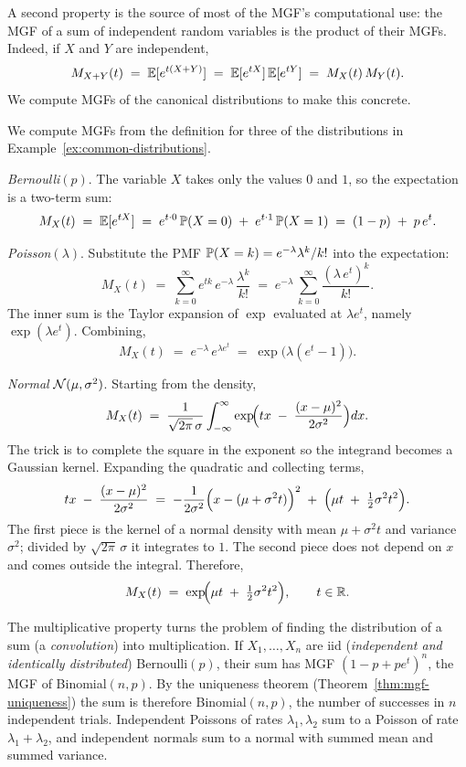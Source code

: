 A second property is the source of most of the MGF's computational use: the MGF of a sum of independent random variables is the product of their MGFs. Indeed, if \(X\) and \(Y\) are independent,
\[
  M_{X+Y}(t) \;=\; \mathbb{E}[e^{t(X+Y)}] \;=\; \mathbb{E}[e^{tX}]\, \mathbb{E}[e^{tY}] \;=\; M_X(t)\, M_Y(t).
\]
We compute MGFs of the canonical distributions to make this concrete.

\begin{example}\label{ex:mgfs}
We compute MGFs from the definition for three of the distributions in Example~\ref{ex:common-distributions}.

\smallskip
\noindent\emph{Bernoulli}\((p)\). The variable \(X\) takes only the values \(0\) and \(1\), so the expectation is a two-term sum:
\[
  M_X(t) \;=\; \mathbb{E}[e^{tX}]
  \;=\; e^{t \cdot 0}\, \mathbb{P}(X = 0) \;+\; e^{t \cdot 1}\, \mathbb{P}(X = 1)
  \;=\; (1 - p) \;+\; p\, e^t.
\]

\smallskip
\noindent\emph{Poisson}\((\lambda)\). Substitute the PMF \(\mathbb{P}(X = k) = e^{-\lambda} \lambda^k / k!\) into the expectation:
\[
  M_X(t) \;=\; \sum_{k = 0}^\infty e^{tk}\, e^{-\lambda}\, \frac{\lambda^k}{k!}
  \;=\; e^{-\lambda}\, \sum_{k = 0}^\infty \frac{(\lambda\, e^{t})^k}{k!}.
\]
The inner sum is the Taylor expansion of \(\exp\) evaluated at \(\lambda e^t\), namely \(\exp(\lambda e^t)\). Combining,
\[
  M_X(t) \;=\; e^{-\lambda}\, e^{\lambda e^t}
  \;=\; \exp\!\bigl(\lambda (e^t - 1)\bigr).
\]

\smallskip
\noindent\emph{Normal} \(\mathcal{N}(\mu, \sigma^2)\). Starting from the density,
\[
  M_X(t) \;=\; \frac{1}{\sqrt{2 \pi}\, \sigma} \int_{-\infty}^\infty \exp\!\Bigl(t x \;-\; \frac{(x - \mu)^2}{2 \sigma^2}\Bigr) dx.
\]
The trick is to complete the square in the exponent so the integrand becomes a Gaussian kernel. Expanding the quadratic and collecting terms,
\[
  t x \;-\; \frac{(x - \mu)^2}{2 \sigma^2}
  \;=\; -\frac{1}{2 \sigma^2}\Bigl(x - (\mu + \sigma^2 t)\Bigr)^2 \;+\; \Bigl(\mu t \;+\; \tfrac{1}{2}\sigma^2 t^2\Bigr).
\]
The first piece is the kernel of a normal density with mean \(\mu + \sigma^2 t\) and variance \(\sigma^2\); divided by \(\sqrt{2 \pi}\, \sigma\) it integrates to \(1\). The second piece does not depend on \(x\) and comes outside the integral. Therefore,
\[
  M_X(t) \;=\; \exp\!\Bigl(\mu t \;+\; \tfrac{1}{2} \sigma^2 t^2\Bigr), \qquad t \in \mathbb{R}.
\]
\end{example}

The multiplicative property turns the problem of finding the distribution of a sum (a \emph{convolution}) into multiplication. If \(X_1, \ldots, X_n\) are iid (\emph{independent and identically distributed}) Bernoulli\((p)\), their sum has MGF \((1 - p + p e^t)^n\), the MGF of Binomial\((n, p)\). By the uniqueness theorem (Theorem~\ref{thm:mgf-uniqueness}) the sum is therefore Binomial\((n, p)\), the number of successes in \(n\) independent trials. Independent Poissons of rates \(\lambda_1, \lambda_2\) sum to a Poisson of rate \(\lambda_1 + \lambda_2\), and independent normals sum to a normal with summed mean and summed variance.

